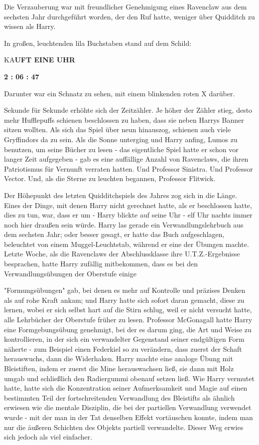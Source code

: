{Die Verzauberung war mit freundlicher Genehmigung eines Ravenclaw aus dem sechsten Jahr durchgeführt worden, der den Ruf hatte, weniger über Quidditch zu wissen als Harry.

In großen, leuchtenden lila Buchstaben stand auf dem Schild:

KA\textbf{UFT EINE UHR}

\textbf{2 : 06 : 47}

Darunter war ein Schnatz zu sehen, mit einem blinkenden roten X darüber.

Sekunde für Sekunde erhöhte sich der Zeitzähler. Je höher der Zähler stieg, desto mehr Hufflepuffs schienen beschlossen zu haben, dass sie neben Harrys Banner sitzen wollten. Als sich das Spiel über neun hinauszog, schienen auch viele Gryffindors da zu sein. Als die Sonne unterging und Harry anfing, Lumos zu benutzen, um seine Bücher zu lesen - das eigentliche Spiel hatte er schon vor langer Zeit aufgegeben - gab es eine auffällige Anzahl von Ravenclaws, die ihren Patriotismus für Vernunft verraten hatten. Und Professor Sinistra. Und Professor Vector. Und, als die Sterne zu leuchten begannen, Professor Flitwick.

Der Höhepunkt des letzten Quidditchspiels des Jahres zog sich in die Länge. Eines der Dinge, mit denen Harry nicht gerechnet hatte, als er beschlossen hatte, dies zu tun, war, dass er um - Harry blickte auf seine Uhr - elf Uhr nachts immer noch hier draußen sein würde. Harry las gerade ein Verwandlungslehrbuch aus dem sechsten Jahr; oder besser gesagt, er hatte das Buch aufgeschlagen, beleuchtet von einem Muggel-Leuchtstab, während er eine der Übungen machte. Letzte Woche, als die Ravenclaws der Abschlussklasse ihre U.T.Z.-Ergebnisse besprachen, hatte Harry zufällig mitbekommen, dass es bei den Verwandlungsübungen der Oberstufe einige

"Formungsübungen" gab, bei denen es mehr auf Kontrolle und präzises Denken als auf rohe Kraft ankam; und Harry hatte sich sofort daran gemacht, diese zu lernen, wobei er sich selbst hart auf die Stirn schlug, weil er nicht versucht hatte, alle Lehrbücher der Oberstufe früher zu lesen. Professor McGonagall hatte Harry eine Formgebungsübung genehmigt, bei der es darum ging, die Art und Weise zu kontrollieren, in der sich ein verwandelter Gegenstand seiner endgültigen Form näherte - zum Beispiel einen Federkiel so zu verändern, dass zuerst der Schaft herauswuchs, dann die Widerhaken. Harry machte eine analoge Übung mit Bleistiften, indem er zuerst die Mine herauswachsen ließ, sie dann mit Holz umgab und schließlich den Radiergummi obenauf setzen ließ. Wie Harry vermutet hatte, hatte sich die Konzentration seiner Aufmerksamkeit und Magie auf einen bestimmten Teil der fortschreitenden Verwandlung des Bleistifts als ähnlich erwiesen wie die mentale Disziplin, die bei der partiellen Verwandlung verwendet wurde - mit der man in der Tat denselben Effekt vortäuschen konnte, indem man nur die äußeren Schichten des Objekts partiell verwandelte. Dieser Weg erwies sich jedoch als viel einfacher.

}
